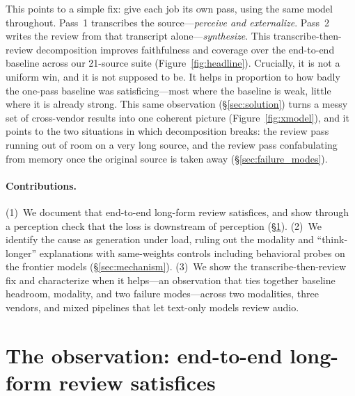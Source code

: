 \documentclass[11pt]{article}
\begin{document}
This points to a simple fix: give each job its own pass, using the same model throughout. Pass~1 transcribes the source---\emph{perceive and externalize}. Pass~2 writes the review from that transcript alone---\emph{synthesize}. This transcribe-then-review decomposition improves faithfulness and coverage over the end-to-end baseline across our 21-source suite (Figure~\ref{fig:headline}). Crucially, it is not a uniform win, and it is not supposed to be. It helps in proportion to how badly the one-pass baseline was satisficing---most where the baseline is weak, little where it is already strong. This same observation (\S\ref{sec:solution}) turns a messy set of cross-vendor results into one coherent picture (Figure~\ref{fig:xmodel}), and it points to the two situations in which decomposition breaks: the review pass running out of room on a very long source, and the review pass confabulating from memory once the original source is taken away (\S\ref{sec:failure_modes}).

\paragraph{Contributions.}
(1)~We document that end-to-end long-form review satisfices, and show through a perception check that the loss is downstream of perception (\S\ref{sec:observation}).
(2)~We identify the cause as generation under load, ruling out the modality and ``think-longer'' explanations with same-weights controls including behavioral probes on the frontier models (\S\ref{sec:mechanism}).
(3)~We show the transcribe-then-review fix and characterize when it helps---an observation that ties together baseline headroom, modality, and two failure modes---across two modalities, three vendors, and mixed pipelines that let text-only models review audio.

\section{The observation: end-to-end long-form review satisfices}
\label{sec:observation}
\end{document}

